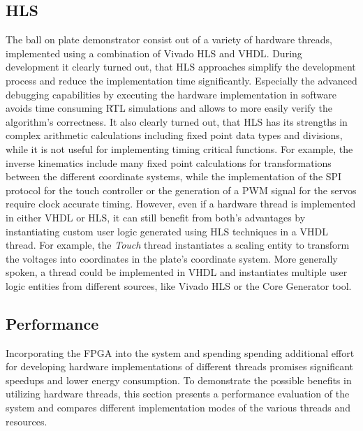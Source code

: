 \subsection{\acl{HLS}}
The ball on plate demonstrator consist out of a variety of hardware threads,
implemented using a combination of Vivado HLS and \ac{VHDL}. During
development it clearly turned out, that \ac{HLS} approaches simplify the
development process and reduce the implementation time significantly.
Especially the advanced debugging capabilities by executing the hardware
implementation in software avoids time consuming \ac{RTL} simulations and
allows to more easily verify the algorithm's correctness. It also clearly
turned out, that \ac{HLS} has its strengths in complex arithmetic calculations
including fixed point data types and divisions, while it is not useful for
implementing timing critical functions. For example, the inverse kinematics
include many fixed point calculations for transformations between the
different coordinate systems, while the implementation of the \ac{SPI}
protocol for the touch controller or the generation of a \ac{PWM} signal for
the servos require clock accurate timing. However, even if a hardware thread
is implemented in either \ac{VHDL} or \ac{HLS}, it can still benefit from
both's advantages by instantiating custom user logic generated using \ac{HLS}
techniques in a \ac{VHDL} thread. For example, the \emph{Touch} thread
instantiates a scaling entity to transform the voltages into coordinates in
the plate's coordinate system. More generally spoken, a thread could be
implemented in \ac{VHDL} and instantiates multiple user logic entities from
different sources, like Vivado HLS or the Core Generator tool.

\subsection{Performance}
Incorporating the \ac{FPGA} into the system and spending spending additional
effort for developing hardware implementations of different threads promises
significant speedups and lower energy consumption. To demonstrate the possible
benefits in utilizing hardware threads, this section presents a performance
evaluation of the system and compares different implementation modes of the
various threads and resources.

